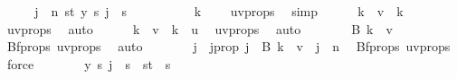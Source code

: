 \begin{isabellebody}
\isanewline
\ \ \isamarkupfalse%
\ \isamarkupfalse%
\ {\isachardoublequoteopen}{\isasymexists}j\ {\isacharless}{\kern0pt}\ n{\isachardot}{\kern0pt}\ {\isasymforall}s{\isacharless}{\kern0pt}t{\isacharplus}{\kern0pt}{}{\isachardot}{\kern0pt}\ y\ s\ j\ {\isacharequal}{\kern0pt}\ s{\isachardoublequoteclose}\isanewline
\ \ \isamarkupfalse%
\ {\isacharminus}{\kern0pt}\isanewline
\ \ \ \ \isamarkupfalse%
\ {\isachardoublequoteopen}k\ {\isachargreater}{\kern0pt}\ {}{\isachardoublequoteclose}\ \isamarkupfalse%
\ uv{\isacharunderscore}{\kern0pt}props\ \isamarkupfalse%
\ simp\isanewline
\ \ \ \ \isamarkupfalse%
\ {\isachardoublequoteopen}k\ {\isacharminus}{\kern0pt}\ v\ {\isacharless}{\kern0pt}\ k{\isachardoublequoteclose}\ \isamarkupfalse%
\ uv{\isacharunderscore}{\kern0pt}props\ \isamarkupfalse%
\ auto\isanewline
\ \ \ \ \isamarkupfalse%
\ {\isachardoublequoteopen}k\ {\isacharminus}{\kern0pt}\ v\ {\isacharless}{\kern0pt}\ k\ {\isacharminus}{\kern0pt}\ u{\isachardoublequoteclose}\ \isamarkupfalse%
\ uv{\isacharunderscore}{\kern0pt}props\ \isamarkupfalse%
\ auto\isanewline
\ \ \ \ \isamarkupfalse%
\ \isamarkupfalse%
\ {\isachardoublequoteopen}B\ {\isacharparenleft}{\kern0pt}k\ {\isacharminus}{\kern0pt}\ v{\isacharparenright}{\kern0pt}\ {\isasymnoteq}\ {\isacharbraceleft}{\kern0pt}{\isacharbraceright}{\kern0pt}{\isachardoublequoteclose}\ \isamarkupfalse%
\ Bf{\isacharunderscore}{\kern0pt}props{\isacharparenleft}{\kern0pt}{}{\isacharparenright}{\kern0pt}\ uv{\isacharunderscore}{\kern0pt}props\ \isamarkupfalse%
\ auto\isanewline
\ \ \ \ \isamarkupfalse%
\ \isamarkupfalse%
\ j\ \ j{\isacharunderscore}{\kern0pt}prop{\isacharcolon}{\kern0pt}\ {\isachardoublequoteopen}j\ {\isasymin}\ B\ {\isacharparenleft}{\kern0pt}k\ {\isacharminus}{\kern0pt}\ v{\isacharparenright}{\kern0pt}\ {\isasymand}\ j\ {\isacharless}{\kern0pt}\ n{\isachardoublequoteclose}\ \isamarkupfalse%
\ Bf{\isacharunderscore}{\kern0pt}props{\isacharparenleft}{\kern0pt}{}{\isacharparenright}{\kern0pt}\ uv{\isacharunderscore}{\kern0pt}props\ \isamarkupfalse%
\ force\isanewline
\ \ \ \ \isamarkupfalse%
\ \isamarkupfalse%
\ {\isachardoublequoteopen}y\ s\ j\ {\isacharequal}{\kern0pt}\ s{\isachardoublequoteclose}\ \ {\isachardoublequoteopen}s{\isacharless}{\kern0pt}t{\isacharplus}{\kern0pt}{}{\isachardoublequoteclose}\ \ s\isanewline

\end{isabellebody}
